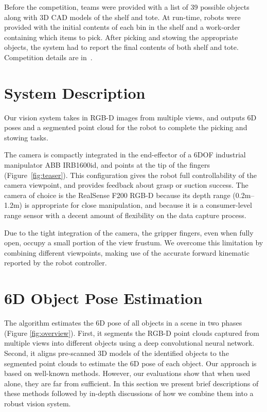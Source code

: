 \documentclass[letterpaper, 10 pt, conference]{ieeeconf}  %
\newcommand{\figref}[1]{Figure~\ref{#1}}
\begin{document}
Before the competition, teams were provided with a list of 39 possible objects along with 3D CAD models of the shelf and tote. At run-time, robots were provided with the initial contents of each bin in the shelf and a work-order containing which items to pick. After picking and stowing the appropriate objects, the system had to report the final contents of both shelf and tote. Competition details are in~\cite{apcwebsite}.


\section{System Description}
Our vision system takes in RGB-D images from multiple views, and outputs 6D poses and a segmented point cloud for the robot to complete the picking and stowing tasks. 




The camera is compactly integrated in the end-effector of a 6DOF industrial manipulator ABB IRB1600id, and points at the tip of the fingers (\figref{fig:teaser}). This configuration gives the robot full controllability of the camera viewpoint, and provides feedback about grasp or suction success.
The camera of choice is the RealSense F200 RGB-D because its depth range (0.2m--1.2m) is appropriate for close manipulation, and because it is a consumer-level range sensor with a decent amount of flexibility on the data capture process. 

Due to the tight integration of the camera, the gripper fingers, even when fully open, occupy a small portion of the view frustum. We overcome this limitation by combining different viewpoints, making use of the accurate forward kinematic reported by the robot controller.


\section{6D Object Pose Estimation}
\label{sec:pose_estimate}
The algorithm estimates the 6D pose of all objects in a scene in two phases (Figure \ref{fig:overview}).
First, it segments the RGB-D point clouds captured from multiple views into different objects using a deep convolutional neural network.
Second, it aligns pre-scanned 3D models of the identified objects to the segmented point clouds to estimate the 6D pose of each object.
Our approach is based on well-known methods. However, our evaluations show that when used alone, they are far from sufficient. In this section we present brief descriptions of these methods followed by in-depth discussions of how we combine them into a robust vision system.
\end{document}
